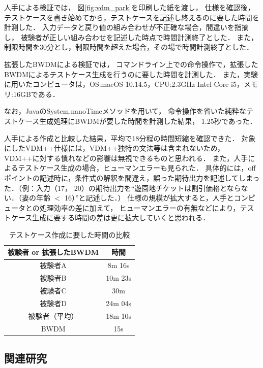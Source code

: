 \documentclass[uplatex, report, a4j, 10pt]{jsbook}
\begin{document}
人手による検証では，
図\ref{fig:vdm_park}を印刷した紙を渡し，
仕様を確認後，
テストケースを書き始めてから，テストケースを記述し終えるのに要した時間を計測した．
入力データと戻り値の組み合わせが不正確な場合，間違いを指摘し，
被験者が正しい組み合わせを記述した時点で時間計測終了とした．
また，制限時間を30分とし，制限時間を超えた場合，その場で時間計測終了とした．

拡張したBWDMによる検証では，
コマンドライン上での命令操作で，拡張したBWDMによるテストケース生成を行うのに要した時間を計測した．
また，実験に用いたコンピュータは，OS:macOS 10.14.5，CPU:2.3GHz Intel Core i5，メモリ:16GBである．

なお，JavaのSystem.nanoTime\cite{nanotime}メソッドを用いて，
命令操作を省いた純粋なテストケース生成処理にBWDMが要した時間を計測した結果，
1.25秒であった．

人手による作成と比較した結果，平均で18分程の時間短縮を確認できた．
対象にしたVDM++仕様には，VDM++独特の文法等は含まれないため，
VDM++に対する慣れなどの影響は無視できるものと思われる．
また，人手によるテストケース生成の場合，ヒューマンエラーも見られた．
具体的には，offポイントの記述時に，条件式の解釈を間違え，誤った期待出力を記述してしまった．（例：入力（17， 20）の期待出力を“遊園地チケットは割引価格とならない．（妻の年齢 $<$ 16）”と記述した．）
仕様の規模が拡大すると，人手とコンピュータとの処理効率の差に加えて，
ヒューマンエラーの有無などにより，テストケース生成に要する時間の差は更に拡大していくと思われる．

\begin{table}[t]
  \begin{center}
    \caption{テストケース作成に要した時間の比較}
    \label{tab:time}
    \begin{tabular}{c|c}
      被験者 or 拡張したBWDM & 時間    \\
      \hline
      \hline
      被験者A                & 8m 16s  \\
      被験者B                & 10m 23s \\
      被験者C                & 30m     \\
      被験者D                & 24m 04s \\
      被験者（平均）         & 18m 10s \\
      BWDM                   & 15s     \\
      \hline
    \end{tabular}
  \end{center}
\end{table}

\subsection{関連研究}

\end{document}
